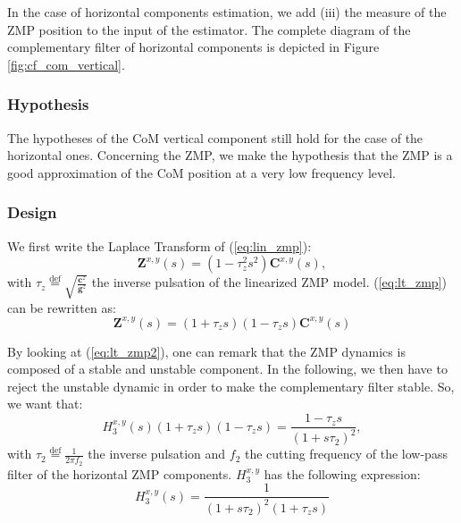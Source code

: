 In the case of horizontal components estimation, we add (iii) the measure of the  ZMP position to the input of the estimator. The complete diagram of the complementary filter of horizontal components is depicted in Figure \ref{fig:cf_com_vertical}.

\subsubsection{Hypothesis}
The hypotheses of the CoM vertical component still hold for the case of the horizontal ones. Concerning the ZMP, we make the hypothesis that the ZMP is a good approximation of the CoM position at a very low frequency level. 

\subsubsection{Design}

We first write the Laplace Transform of (\ref{eq:lin_zmp}):
\begin{equation}
  \bm{Z}^{x,y} (s) = \left(1 -  \tau_{z}^{2} s^{2}\right) \bm C^{x,y} (s),
  \label{eq:lt_zmp}
\end{equation}
with $\tau_{z} \overset{\text{def}}{=} \sqrt{\frac{\bm c^{z}}{\bm g^{z}}}$ the inverse pulsation of the linearized ZMP model. (\ref{eq:lt_zmp}) can be rewritten as:
\begin{equation}
  \bm{Z}^{x,y} (s) = \left(1 +  \tau_{z}s\right) \left(1 -  \tau_{z}s\right) \bm C^{x,y} (s)
  \label{eq:lt_zmp2}
\end{equation}

By looking at (\ref{eq:lt_zmp2}), one can remark that the ZMP dynamics is composed of a stable and unstable component. In the following, we then have to reject the unstable dynamic in order to make the complementary filter stable. So, we want that:
\begin{equation}
  H^{x,y}_{3} (s) (1 + \tau_{z}s)(1 - \tau_{z}s)= \frac{1 - \tau_{z}s}{(1+s\tau_{2})^{2}},
  \label{eq:zmp_filter1}
\end{equation}
with $\tau_{2} \overset{\text{def}}{=} \frac{1}{2 \pi f_{2}}$ the inverse pulsation and $f_{2}$ the cutting frequency of the low-pass filter of the horizontal ZMP components. $H^{x,y}_{3}$ has the following expression:
\begin{equation}
  H^{x,y}_{3} (s) = \frac{1}{(1+s\tau_{2})^{2}(1 + \tau_{z}s)}
  \label{eq:zmp_filter2}
\end{equation}

